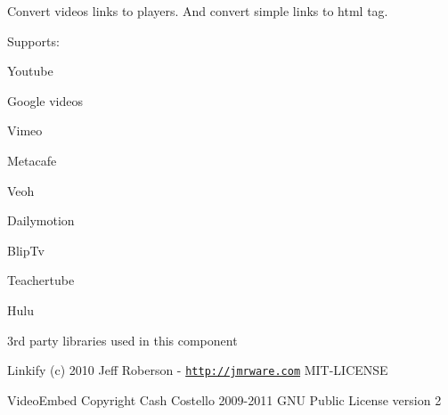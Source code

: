 Convert videos links to players. And convert simple links to html tag.

Supports\+:


\begin{DoxyItemize}
\item Youtube
\item Google videos
\item Vimeo
\item Metacafe
\item Veoh
\item Dailymotion
\item Blip\+Tv
\item Teachertube
\item Hulu
\end{DoxyItemize}

3rd party libraries used in this component


\begin{DoxyItemize}
\item Linkify (c) 2010 Jeff Roberson -\/ \href{http://jmrware.com}{\tt http\+://jmrware.\+com} M\+I\+T-\/\+L\+I\+C\+E\+N\+SE
\item Video\+Embed Copyright Cash Costello 2009-\/2011 G\+NU Public License version 2 
\end{DoxyItemize}